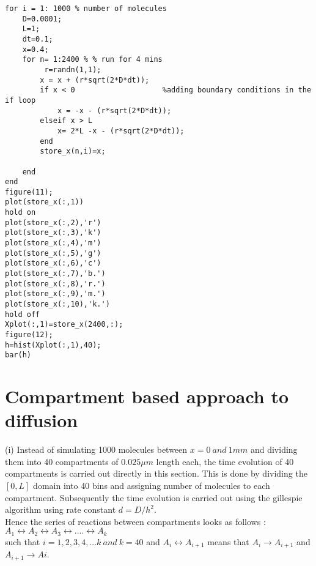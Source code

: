 \documentclass[10 pt]{article}
\begin{document}
\begin{multicols}{2}
\begin{flushleft}
\begin{lstlisting}
for i = 1: 1000 % number of molecules
    D=0.0001;
    L=1;
    dt=0.1;
    x=0.4;    
    for n= 1:2400 % % run for 4 mins
         r=randn(1,1);
        x = x + (r*sqrt(2*D*dt));
        if x < 0					%adding boundary conditions in the if loop
            x = -x - (r*sqrt(2*D*dt));
        elseif x > L
            x= 2*L -x - (r*sqrt(2*D*dt));
        end
        store_x(n,i)=x;
    
    end
end
figure(11);
plot(store_x(:,1))
hold on
plot(store_x(:,2),'r')
plot(store_x(:,3),'k')
plot(store_x(:,4),'m')
plot(store_x(:,5),'g')
plot(store_x(:,6),'c')    
plot(store_x(:,7),'b.')
plot(store_x(:,8),'r.')
plot(store_x(:,9),'m.')
plot(store_x(:,10),'k.')
hold off
Xplot(:,1)=store_x(2400,:);
figure(12); 
h=hist(Xplot(:,1),40);
bar(h)
\end{lstlisting}
\end{flushleft}
\section{Compartment based approach to diffusion}
\begin{flushleft}
(i)	Instead of simulating 1000 molecules  between $x= 0\: and\: 1 mm$ and dividing them into 40 compartments of $0.025 \mu m$ length each, the time evolution of 40 compartments is carried out directly in this section. This is done by dividing the $[0,L]$ domain into 40 bins and assigning number of molecules to each compartment. Subsequently the time evolution is carried out using the gillespie algorithm using rate constant $d = D/h^2$.\\
Hence the series of reactions between compartments looks as follows :\\
$A_1 \leftrightarrow A_2 \leftrightarrow A_3\leftrightarrow ....\leftrightarrow A_k$\\
such that $i = 1,2,3,4,...k \: and \: k=40$ and $A_i \leftrightarrow A_{i+1}$ means that $A_i \rightarrow A_{i+1}$ and $A_{i+1}\rightarrow A{i}$.
\end{flushleft}
\begin{flushleft}


\end{flushleft}
\end{multicols}
\end{document}
